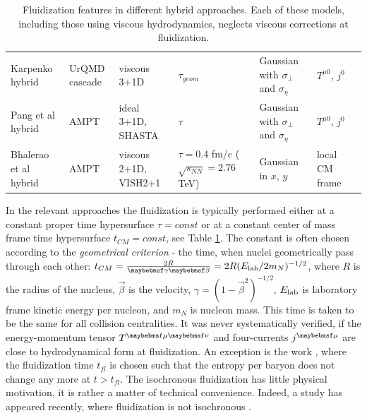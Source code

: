 \begin{table}
\begin{tabular}{p{2.5cm}p{2.5cm}p{2.5cm}p{3cm}p{2.5cm}p{2.5cm}p{2.5cm}}
     Karpenko \newline hybrid~\cite{Karpenko:2015xea} &
     UrQMD \newline cascade &
     viscous 3+1D &
     $\tau_{geom}$ &
     Gaussian with \newline $\sigma_{\perp}$ and $\sigma_{\eta}$ &
     $T^{\mu 0}$, $j^0$ \\

     Pang et al \newline hybrid~\cite{Pang:2012he} &
     AMPT &
     ideal 3+1D, \newline SHASTA &
     $\tau$ &
     Gaussian with \newline $\sigma_{\perp}$ and $\sigma_{\eta}$ &
     $T^{\mu 0}$, $j^0$ \\

     Bhalerao et al \newline hybrid~\cite{Bhalerao:2015iya} &
     AMPT &
     viscous 2+1D, \newline VISH2+1 &
     $\tau = 0.4$ fm/c \newline ($\sqrt{s_{NN}} = 2.76$ TeV) &
     Gaussian in \newline $x$, $y$ &
     local CM frame \\

  \bottomrule[1.5pt]
  \end{tabular}
  \caption{Fluidization features in different hybrid approaches. Each of these
           models, including those using viscous hydrodynamics, neglects viscous
           corrections at fluidization.}
  \label{Tab:models}
\end{table}

In the relevant approaches \cite{Petersen:2008dd,Skokov:2005ut,Werner:2010aa,
Andrade:2005tx,Gale:2012rq,Karpenko:2015xea,Pang:2012he,Bhalerao:2015iya} the
fluidization is typically performed either at a constant proper time hypersurface
$\tau = const$ or at a constant center of mass frame time hypersurface $t_{CM} =
const$, see Table \ref{Tab:models}. The constant is often chosen according to the
\emph{geometrical criterion} - the time, when nuclei geometrically pass through each
other: $t_{CM} = \frac{2R}{\gamma \beta} = 2R (\Elab/2m_N)^{-1/2}$, where $R$ is
the radius of the nucleus, $\vec{\beta}$ is the velocity, $\gamma = (1 -
\vec{\beta}^2)^{-1/2}$, $E_\mathrm{lab}$ is laboratory frame kinetic energy per nucleon, and
$m_N$ is nucleon mass. This time is taken to be the same for all collision
centralities. It was never systematically verified, if the energy-momentum tensor $\Tmn$
and four-currents $\jmu$ are close to hydrodynamical form at fluidization. An
exception is the work \cite{Skokov:2006us}, where the fluidization time $t_{fl}$ is
chosen such that the entropy per baryon does not change any more at $t > t_{fl}$. The
isochronous fluidization has little physical motivation, it is rather a matter of
technical convenience. Indeed, a study has appeared recently, where fluidization is not isochronous \cite{Shen:2017ruz}.


